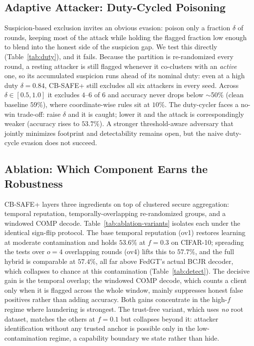 \documentclass[lettersize,journal]{IEEEtran}
\begin{document}
\subsection{Adaptive Attacker: Duty-Cycled Poisoning}
Suspicion-based exclusion invites an obvious evasion: poison only a fraction
$\delta$ of rounds, keeping most of the attack while holding the flagged fraction low
enough to blend into the honest side of the suspicion gap. We test this directly
(Table~\ref{tab:duty}), and it fails.
Because the partition is re-randomized every round, a resting attacker is still
flagged whenever it co-clusters with an \emph{active} one, so its accumulated
suspicion runs ahead of its nominal duty: even at a high duty $\delta{=}0.84$,
CB-SAFE+ still excludes all six attackers in every seed. Across
$\delta\in[0.5,1.0]$ it excludes $4$--$6$ of $6$ and accuracy never drops below
$\sim$50\% (clean baseline $59\%$), where coordinate-wise rules sit at $10\%$. The
duty-cycler faces a no-win trade-off: raise $\delta$ and it is caught; lower it and
the attack is correspondingly weaker (accuracy rises to $53.7\%$). A stronger
threshold-aware adversary that jointly minimizes footprint and detectability remains
open, but the naive duty-cycle evasion does not succeed.


\subsection{Ablation: Which Component Earns the Robustness}
CB-SAFE+ layers three ingredients on top of clustered secure aggregation: temporal
reputation, temporally-overlapping re-randomized groups, and a windowed COMP decode.
Table~\ref{tab:ablation-variants} isolates each under the identical sign-flip
protocol. The base temporal reputation (ov1) restores learning at moderate
contamination and holds $53.6\%$ at $f{=}0.3$ on CIFAR-10; spreading the tests over
$o{=}4$ overlapping rounds (ov4) lifts this to $57.7\%$, and the full hybrid is
comparable at $57.4\%$, all far above FedGT's actual BCJR decoder, which collapses to
chance at this contamination (Table~\ref{tab:detect}). The decisive gain is the
temporal overlap; the windowed COMP decode, which counts a client only when it is
flagged across the whole window, mainly suppresses honest false positives rather than
adding accuracy. Both gains concentrate in the high-$f$ regime where laundering is
strongest. The trust-free variant, which uses
\emph{no} root dataset, matches the others at $f{=}0.1$ but collapses beyond it:
attacker identification without any trusted anchor is possible only in the
low-contamination regime, a capability boundary we state rather than hide.
\end{document}
